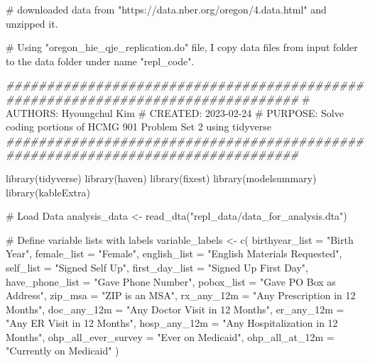\documentclass[
  letterpaper,
  DIV=11,
  numbers=noendperiod]{scrartcl}
\newenvironment{Shaded}{\begin{snugshade}}{\end{snugshade}}
\newcommand{\AttributeTok}[1]{\textcolor[rgb]{0.40,0.45,0.13}{#1}}
\newcommand{\CommentTok}[1]{\textcolor[rgb]{0.37,0.37,0.37}{#1}}
\newcommand{\DocumentationTok}[1]{\textcolor[rgb]{0.37,0.37,0.37}{\textit{#1}}}
\newcommand{\FunctionTok}[1]{\textcolor[rgb]{0.28,0.35,0.67}{#1}}
\newcommand{\NormalTok}[1]{\textcolor[rgb]{0.00,0.23,0.31}{#1}}
\newcommand{\OtherTok}[1]{\textcolor[rgb]{0.00,0.23,0.31}{#1}}
\newcommand{\StringTok}[1]{\textcolor[rgb]{0.13,0.47,0.30}{#1}}
\begin{document}
\begin{Shaded}
\begin{Highlighting}[]
\CommentTok{\# downloaded data from "https://data.nber.org/oregon/4.data.html" and unzipped it.}

\CommentTok{\# Using "oregon\_hie\_qje\_replication.do" file, I copy data files from input folder to the data folder under name "repl\_code".}



\DocumentationTok{\#\#\#\#\#\#\#\#\#\#\#\#\#\#\#\#\#\#\#\#\#\#\#\#\#\#\#\#\#\#\#\#\#\#\#\#\#\#\#\#\#\#\#\#\#\#\#\#\#\#\#\#\#\#\#\#\#\#\#\#\#\#\#\#\#\#\#\#\#\#\#\#\#\#\#\#\#\#\#\#}
\CommentTok{\# AUTHORS: Hyoungchul Kim}
\CommentTok{\# CREATED: 2023{-}02{-}24}
\CommentTok{\# PURPOSE: Solve coding portions of HCMG 901 Problem Set 2 using tidyverse}
\DocumentationTok{\#\#\#\#\#\#\#\#\#\#\#\#\#\#\#\#\#\#\#\#\#\#\#\#\#\#\#\#\#\#\#\#\#\#\#\#\#\#\#\#\#\#\#\#\#\#\#\#\#\#\#\#\#\#\#\#\#\#\#\#\#\#\#\#\#\#\#\#\#\#\#\#\#\#\#\#\#\#\#\#}

\FunctionTok{library}\NormalTok{(tidyverse)}
\FunctionTok{library}\NormalTok{(haven)}
\FunctionTok{library}\NormalTok{(fixest)}
\FunctionTok{library}\NormalTok{(modelsummary)}
\FunctionTok{library}\NormalTok{(kableExtra)}

\CommentTok{\# Load Data}
\NormalTok{analysis\_data }\OtherTok{\textless{}{-}} \FunctionTok{read\_dta}\NormalTok{(}\StringTok{"repl\_data/data\_for\_analysis.dta"}\NormalTok{)}


\CommentTok{\# Define variable lists with labels}
\NormalTok{variable\_labels }\OtherTok{\textless{}{-}} \FunctionTok{c}\NormalTok{(}
  \AttributeTok{birthyear\_list =} \StringTok{"Birth Year"}\NormalTok{,}
  \AttributeTok{female\_list =} \StringTok{"Female"}\NormalTok{,}
  \AttributeTok{english\_list =} \StringTok{"English Materials Requested"}\NormalTok{,}
  \AttributeTok{self\_list =} \StringTok{"Signed Self Up"}\NormalTok{,}
  \AttributeTok{first\_day\_list =} \StringTok{"Signed Up First Day"}\NormalTok{,}
  \AttributeTok{have\_phone\_list =} \StringTok{"Gave Phone Number"}\NormalTok{,}
  \AttributeTok{pobox\_list =} \StringTok{"Gave PO Box as Address"}\NormalTok{,}
  \AttributeTok{zip\_msa =} \StringTok{"ZIP is an MSA"}\NormalTok{,}
  \AttributeTok{rx\_any\_12m =} \StringTok{"Any Prescription in 12 Months"}\NormalTok{,}
  \AttributeTok{doc\_any\_12m =} \StringTok{"Any Doctor Visit in 12 Months"}\NormalTok{,}
  \AttributeTok{er\_any\_12m =} \StringTok{"Any ER Visit in 12 Months"}\NormalTok{,}
  \AttributeTok{hosp\_any\_12m =} \StringTok{"Any Hospitalization in 12 Months"}\NormalTok{,}
  \AttributeTok{ohp\_all\_ever\_survey =} \StringTok{"Ever on Medicaid"}\NormalTok{,}
  \AttributeTok{ohp\_all\_at\_12m =} \StringTok{"Currently on Medicaid"}
\NormalTok{)}


\end{Highlighting}
\end{Shaded}
\end{document}
